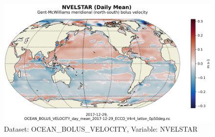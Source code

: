 \begin{figure}[H]
\centering
\includegraphics[scale=0.55]{../images/plots/latlon_plots/Gent-McWilliams_Ocean_Bolus_Velocity/NVELSTAR.png}
\caption{Dataset: OCEAN\_BOLUS\_VELOCITY, Variable: NVELSTAR}
\label{tab:table-OCEAN_BOLUS_VELOCITY_NVELSTAR-Plot}
\end{figure}
\pagebreak
